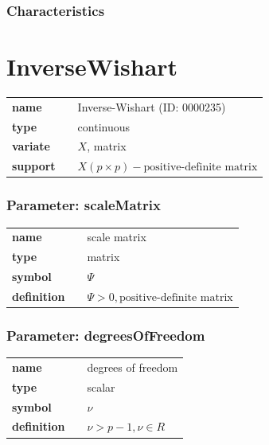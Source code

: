 \subsubsection*{Characteristics}
\smallskip
\section*{InverseWishart} 

  \bigskip 

\begin{tabular}{p{2cm}cl}
\textbf{name} & & Inverse-Wishart (ID: 0000235)\\ 
 
\textbf{type} & & continuous \\ 

\textbf{variate} & & $X$, matrix \\ 

\textbf{support} & & $X(p \times p) - \text{positive-definite matrix}$
\end{tabular}


\subsubsection*{Parameter: scaleMatrix}

\noindent\begin{tabular}{p{2cm}cl}
\textbf{name} & & scale matrix \\
\textbf{type} & & matrix \\
\textbf{symbol} & & $\Psi$  \\
\textbf{definition} & & $\Psi > 0, \text{positive-definite matrix}$
\end{tabular}
\subsubsection*{Parameter: degreesOfFreedom}

\noindent\begin{tabular}{p{2cm}cl}
\textbf{name} & & degrees of freedom \\
\textbf{type} & & scalar \\
\textbf{symbol} & & $\nu$  \\
\textbf{definition} & & $\nu > p-1, \nu \in  R$
\end{tabular}
